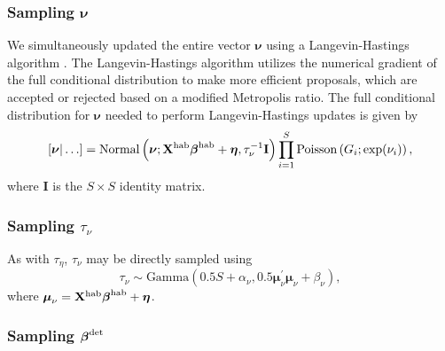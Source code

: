 \documentclass[10pt]{article}
\begin{document}
\subsubsection*{Sampling $\boldsymbol{\nu}$}
We simultaneously updated the entire vector $\boldsymbol{\nu}$ using a Langevin-Hastings algorithm \cite{RobertCasella2004}.  The Langevin-Hastings algorithm utilizes the numerical gradient of the full conditional distribution to make more efficient proposals, which are accepted or rejected based on a modified Metropolis ratio.  The full conditional distribution for $\boldsymbol{\nu}$ needed to perform Langevin-Hastings updates is given by
$$
\left[ \boldsymbol{\nu} | \hdots \right] = \textrm{Normal}\left(\boldsymbol{\nu};{\bf X}^{\rm hab}\boldsymbol{\beta}^{\rm hab}+\boldsymbol{\eta},\tau_\nu^{-1} {\bf I} \right) \prod_{i=1}^S \textrm{Poisson} \left( G_i; \exp(\nu_i) \right),
$$
where {\bf I} is the $S\times S$ identity matrix.

\subsubsection*{Sampling $\tau_\nu$}
As with $\tau_\eta$, $\tau_\nu$ may be directly sampled using
$$
\tau_\nu \sim \textrm{Gamma}\left( 0.5S+\alpha_\nu,0.5\boldsymbol{\mu}_\nu^\prime \boldsymbol{\mu}_\nu+\beta_\nu \right),
$$
where $\boldsymbol{\mu}_\nu={\bf X}^{\rm hab}\boldsymbol{\beta}^{\rm hab}+\boldsymbol{\eta}$.

\subsubsection*{Sampling $\boldsymbol{\beta}^{\rm det}$}
\end{document}
